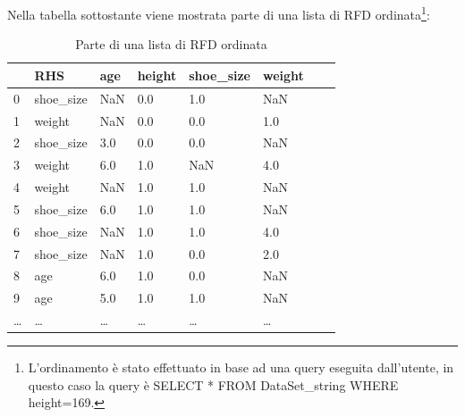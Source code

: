 Nella tabella sottostante viene mostrata parte di una lista di RFD ordinata\footnote{L'ordinamento è stato effettuato in base ad una query eseguita dall'utente, in questo caso la query è SELECT * FROM DataSet{\_}string WHERE height=169.}:
\begin{table}[H]
    \centering
    \begin{tabular}{l l l l l l l l}
        & RHS & age & height & shoe{\_}size & weight \\
        \hline
    0 & shoe{\_}size & NaN & 0.0 & 1.0 & NaN \\
    1 & weight & NaN & 0.0 & 0.0 & 1.0 \\
    2 & shoe{\_}size & 3.0 & 0.0 & 0.0 & NaN \\
    3 & weight & 6.0 & 1.0 & NaN & 4.0 \\
    4 & weight & NaN & 1.0 & 1.0 & NaN \\
    5 & shoe{\_}size & 6.0 & 1.0 & 1.0 & NaN \\
    6 & shoe{\_}size & NaN & 1.0 & 1.0 & 4.0 \\
    7 & shoe{\_}size & NaN & 1.0 & 0.0 & 2.0 \\
    8 & age & 6.0 & 1.0 & 0.0 & NaN \\
    9 & age & 5.0 & 1.0 & 1.0 & NaN \\
    \ldots & \ldots & \ldots & \ldots & \ldots & \ldots \\
    \end{tabular}
    \caption{Parte di una lista di RFD ordinata}
    \label{tab:ord_rdf}
\end{table}

